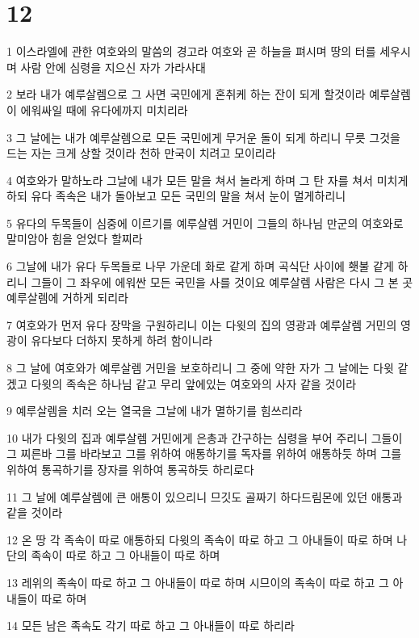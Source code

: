 \chapter{12}

\par 1 이스라엘에 관한 여호와의 말씀의 경고라 여호와 곧 하늘을 펴시며 땅의 터를 세우시며 사람 안에 심령을 지으신 자가 가라사대
\par 2 보라 내가 예루살렘으로 그 사면 국민에게 혼취케 하는 잔이 되게 할것이라 예루살렘이 에워싸일 때에 유다에까지 미치리라
\par 3 그 날에는 내가 예루살렘으로 모든 국민에게 무거운 돌이 되게 하리니 무릇 그것을 드는 자는 크게 상할 것이라 천하 만국이 치려고 모이리라
\par 4 여호와가 말하노라 그날에 내가 모든 말을 쳐서 놀라게 하며 그 탄 자를 쳐서 미치게 하되 유다 족속은 내가 돌아보고 모든 국민의 말을 쳐서 눈이 멀게하리니
\par 5 유다의 두목들이 심중에 이르기를 예루살렘 거민이 그들의 하나님 만군의 여호와로 말미암아 힘을 얻었다 할찌라
\par 6 그날에 내가 유다 두목들로 나무 가운데 화로 같게 하며 곡식단 사이에 횃불 같게 하리니 그들이 그 좌우에 에워싼 모든 국민을 사를 것이요 예루살렘 사람은 다시 그 본 곳 예루살렘에 거하게 되리라
\par 7 여호와가 먼저 유다 장막을 구원하리니 이는 다윗의 집의 영광과 예루살렘 거민의 영광이 유다보다 더하지 못하게 하려 함이니라
\par 8 그 날에 여호와가 예루살렘 거민을 보호하리니 그 중에 약한 자가 그 날에는 다윗 같겠고 다윗의 족속은 하나님 같고 무리 앞에있는 여호와의 사자 같을 것이라
\par 9 예루살렘을 치러 오는 열국을 그날에 내가 멸하기를 힘쓰리라
\par 10 내가 다윗의 집과 예루살렘 거민에게 은총과 간구하는 심령을 부어 주리니 그들이 그 찌른바 그를 바라보고 그를 위하여 애통하기를 독자를 위하여 애통하듯 하며 그를 위하여 통곡하기를 장자를 위하여 통곡하듯 하리로다
\par 11 그 날에 예루살렘에 큰 애통이 있으리니 므깃도 골짜기 하다드림몬에 있던 애통과 같을 것이라
\par 12 온 땅 각 족속이 따로 애통하되 다윗의 족속이 따로 하고 그 아내들이 따로 하며 나단의 족속이 따로 하고 그 아내들이 따로 하며
\par 13 레위의 족속이 따로 하고 그 아내들이 따로 하며 시므이의 족속이 따로 하고 그 아내들이 따로 하며
\par 14 모든 남은 족속도 각기 따로 하고 그 아내들이 따로 하리라

